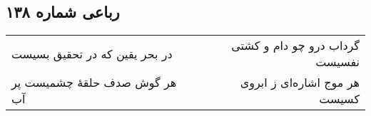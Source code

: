 \begin{center}
\section*{رباعی شماره ۱۳۸}
\label{sec:sh138}
\begin{longtable}{l p{0.5cm} r}
در بحر یقین که در تحقیق بسیست
&&
گرداب درو چو دام و کشتی نفسیست
\\
هر گوش صدف حلقهٔ چشمیست پر آب
&&
هر موج اشاره‌ای ز ابروی کسیست
\\
\end{longtable}
\end{center}
